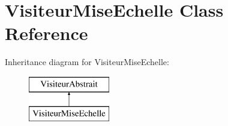 \hypertarget{class_visiteur_mise_echelle}{}\section{Visiteur\+Mise\+Echelle Class Reference}
\label{class_visiteur_mise_echelle}
Inheritance diagram for Visiteur\+Mise\+Echelle\+:\begin{figure}[H]
\begin{center}
\leavevmode
\includegraphics[height=2.000000cm]{class_visiteur_mise_echelle}
\end{center}
\end{figure}
